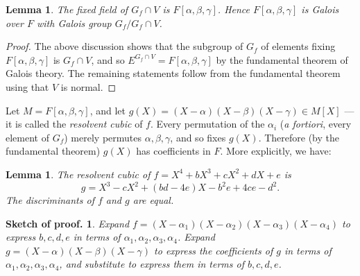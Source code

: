 \documentclass[a4paper,11pt,final,openany]{memoir}
\newtheorem{lemma}[X]{Lemma}
\theoremstyle{nonumberplain}
\newtheorem{proof}{Proof.}
\newtheorem{sproof}{Sketch of proof.}
\begin{document}
\noindent\begin{minipage}{4.0in}
\begin{lemma}
\label{cg7}The fixed field of $G_{f}\cap V$ is $F[\alpha,\beta,\gamma]$. Hence
$F[\alpha,\beta,\gamma]$ is Galois over $F$ with Galois group $G_{f}/G_{f}\cap
V$.
\end{lemma}
\begin{proof}
The above discussion shows that the subgroup of $G_{f}$ of elements fixing
$F[\alpha,\beta,\gamma]$ is $G_{f}\cap V$, and so $E^{G_{f}\cap V}%
=F[\alpha,\beta,\gamma]$ by the fundamental theorem of Galois theory. The
remaining statements follow from the fundamental theorem using that $V$ is normal.
\end{proof}{\smallskip}
\end{minipage}\hspace{0.3in} \begin{minipage}{1in}
\end{minipage}


\medskip Let $M=F[\alpha,\beta,\gamma]$, and let $g(X)=(X-\alpha
)(X-\beta)(X-\gamma)\in M[X]$ --- it is called the \emph{resolvent cubic\/}
%
of $f$. Every permutation of the $\alpha_{i}$ (\textit{a fortiori}, every
element of $G_{f}$) merely permutes $\alpha,\beta,\gamma$, and so fixes
$g(X)$. Therefore (by the fundamental theorem) $g(X)$ has coefficients in $F$.
More explicitly, we have:

\begin{lemma}
\label{cg8}The resolvent cubic of $f=X^{4}+bX^{3}+cX^{2}+dX+e$ is
\[
g=X^{3}-cX^{2}+(bd-4e)X-b^{2}e+4ce-d^{2}.
\]
The discriminants of $f$ and $g$ are equal.
\end{lemma}

\begin{sproof}
Expand $f=(X-\alpha_{1})(X-\alpha_{2})(X-\alpha_{3})(X-\alpha_{4})$ to express
$b,c,d,e$ in terms of $\alpha_{1},\alpha_{2},\alpha_{3},\alpha_{4}$. Expand
$g=(X-\alpha)(X-\beta)(X-\gamma)$ to express the coefficients of $g$ in terms
of $\alpha_{1},\alpha_{2},\alpha_{3},\alpha_{4}$, and substitute to express
them in terms of $b,c,d,e$.
\end{sproof}
\end{document}
